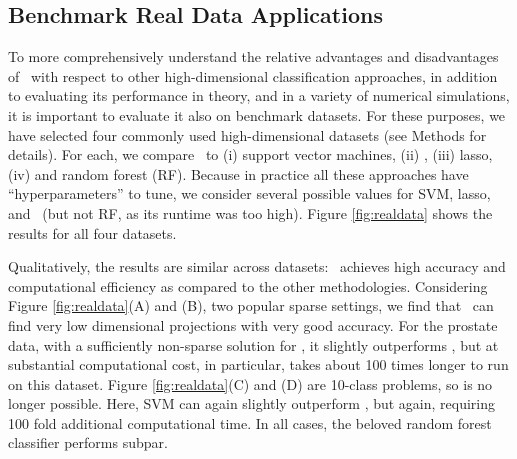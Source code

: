 \documentclass[10pt]{article}
\begin{document}
\subsection*{Benchmark Real Data Applications}


To more comprehensively understand the relative advantages and disadvantages of \Lol~with respect to other high-dimensional classification approaches, in addition to evaluating its performance in theory, and in a variety of numerical simulations, 
 it is important to evaluate it also on benchmark datasets.  For these purposes, we have selected four commonly used high-dimensional datasets (see Methods for details).  For each, we compare \Lol~to (i) support vector machines, (ii) , (iii) lasso, (iv) and random forest (RF).  Because in practice all these approaches have ``hyperparameters'' to tune, we consider several possible values for  SVM, lasso, and \Lol~(but not RF, as its runtime was too high).  Figure \ref{fig:realdata} shows the results for all four datasets.  

 Qualitatively, the results are similar across datasets: \Lol~achieves high accuracy and computational efficiency as compared to the other methodologies.  Considering Figure \ref{fig:realdata}(A) and (B), two popular sparse settings, we find that \Lol~can find very low dimensional projections with very good accuracy. For the prostate data, with a sufficiently non-sparse solution for , it slightly outperforms \Lol, but at substantial computational cost, in particular,  takes about 100 times longer to run on this dataset.   Figure \ref{fig:realdata}(C) and (D) are 10-class problems, so  is no longer possible.  Here, SVM can again slightly outperform \Lol, but again, requiring 100 fold additional computational time.  In all cases, the beloved random forest classifier performs subpar.
\end{document}
